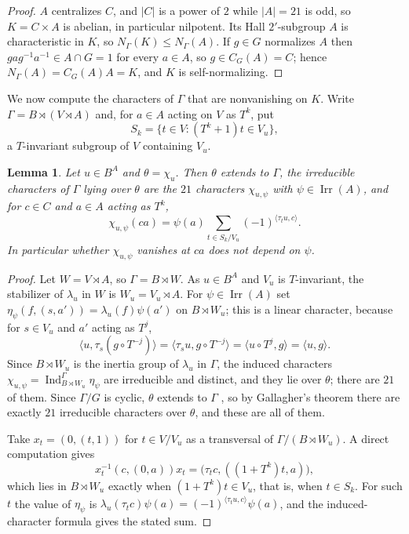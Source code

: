 \documentclass[11pt,a4paper,reqno]{amsart}
\newtheorem{lemma}[theorem]{Lemma}
\theoremstyle{definition}
\theoremstyle{remark}
\newcommand{\Irr}{\operatorname{Irr}}
\newcommand{\Ind}{\operatorname{Ind}}
\begin{document}
\begin{proof}
$A$ centralizes $C$, and $|C|$ is a power of $2$ while $|A|=21$ is odd,
so $K=C\times A$ is abelian, in particular nilpotent.  Its Hall
$2'$-subgroup $A$ is characteristic in $K$, so
$N_\Gamma(K)\le N_\Gamma(A)$.  If $g\in G$ normalizes $A$ then
$gag^{-1}a^{-1}\in A\cap G=1$ for every $a\in A$, so $g\in C_G(A)=C$;
hence $N_\Gamma(A)=C_G(A)A=K$, and $K$ is self-normalizing.
\end{proof}

We now compute the characters of $\Gamma$ that are nonvanishing on $K$.
Write $\Gamma=B\rtimes(V\rtimes A)$ and, for $a\in A$ acting on $V$ as
$T^k$, put
\[
 S_k=\{t\in V:(T^k+1)t\in V_u\},
\]
a $T$-invariant subgroup of $V$ containing $V_u$.

\begin{lemma}\label{lem:gamma-values}
Let $u\in B^A$ and $\theta=\chi_u$.  Then $\theta$ extends to $\Gamma$,
the irreducible characters of $\Gamma$ lying over $\theta$ are the $21$
characters $\chi_{u,\psi}$ with $\psi\in\Irr(A)$, and for $c\in C$ and
$a\in A$ acting as $T^k$,
\[
 \chi_{u,\psi}(ca)=\psi(a)\sum_{t\in S_k/V_u}(-1)^{\langle\tau_tu,c\rangle}.
\]
In particular whether $\chi_{u,\psi}$ vanishes at $ca$ does not depend on
$\psi$.
\end{lemma}

\begin{proof}
Let $W=V\rtimes A$, so $\Gamma=B\rtimes W$.  As $u\in B^A$ and $V_u$ is
$T$-invariant, the stabilizer of $\lambda_u$ in $W$ is
$W_u=V_u\rtimes A$.  For $\psi\in\Irr(A)$ set
$\eta_\psi(f,(s,a'))=\lambda_u(f)\psi(a')$ on $B\rtimes W_u$; this is a
linear character, because for $s\in V_u$ and $a'$ acting as $T^j$,
\[
 \langle u,\tau_s(g\circ T^{-j})\rangle
 =\langle\tau_su,g\circ T^{-j}\rangle
 =\langle u\circ T^{j},g\rangle=\langle u,g\rangle .
\]
Since $B\rtimes W_u$ is the inertia group of $\lambda_u$ in $\Gamma$,
the induced characters $\chi_{u,\psi}=\Ind_{B\rtimes W_u}^\Gamma\eta_\psi$
are irreducible and distinct, and they lie over $\theta$; there are
$21$ of them.  Since $\Gamma/G$ is cyclic, $\theta$ extends to
$\Gamma$ \cite[Corollary 11.22]{isaacs-book}, so by Gallagher's
theorem \cite[Corollary 6.17]{isaacs-book} there are exactly $21$
irreducible characters over $\theta$, and these are all of them.

Take $x_t=(0,(t,1))$ for $t\in V/V_u$ as a transversal of
$\Gamma/(B\rtimes W_u)$.  A direct computation gives
\[
 x_t^{-1}(c,(0,a))x_t=\bigl(\tau_tc,((1+T^k)t,a)\bigr),
\]
which lies in $B\rtimes W_u$ exactly when $(1+T^k)t\in V_u$, that is,
when $t\in S_k$.  For such $t$ the value of $\eta_\psi$ is
$\lambda_u(\tau_tc)\psi(a)=(-1)^{\langle\tau_tu,c\rangle}\psi(a)$, and
the induced-character formula gives the stated sum.
\end{proof}
\end{document}
